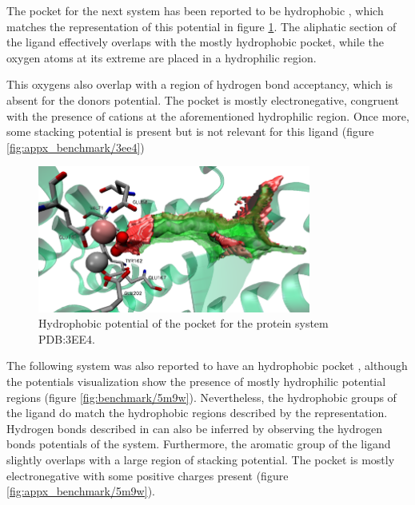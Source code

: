     The pocket for the next system has been reported to be hydrophobic \cite{benchmark_hydrophobic_2009}, which matches the representation of this potential in figure \ref{fig:benchmark/3ee4}. The aliphatic section of the ligand effectively overlaps with the mostly hydrophobic pocket, while the oxygen atoms at its extreme are placed in a hydrophilic region.

    This oxygens also overlap with a region of hydrogen bond acceptancy, which is absent for the donors potential. The pocket is mostly electronegative, congruent with the presence of cations at the aforementioned hydrophilic region. Once more, some stacking potential is present but is not relevant for this ligand (figure \ref{fig:appx_benchmark/3ee4})

    \begin{figure}[H]
      \centering
      \includegraphics[width=0.8\textwidth]{figures/results/benchmark_prot/3ee4.png}
      \caption{\label{fig:benchmark/3ee4} Hydrophobic potential of the pocket for the protein system PDB:3EE4.}
    \end{figure}

    The following system was also reported to have an hydrophobic pocket \cite{hydrophobic_2017}, although the potentials visualization show the presence of mostly hydrophilic potential regions (figure \ref{fig:benchmark/5m9w}). Nevertheless, the hydrophobic groups of the ligand do match the hydrophobic regions described by the representation. Hydrogen bonds described in \cite{hydrophobic_2017} can also be inferred by observing the hydrogen bonds potentials of the system. Furthermore, the aromatic group of the ligand slightly overlaps with a large region of stacking potential. The pocket is mostly electronegative with some positive charges present (figure \ref{fig:appx_benchmark/5m9w}).

